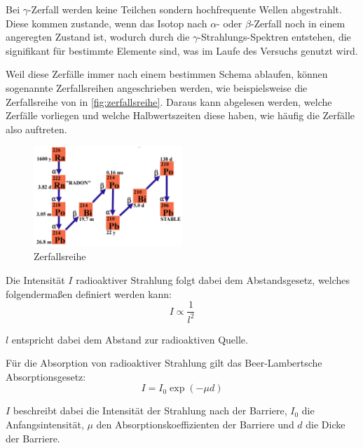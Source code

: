 \documentclass[12pt,english,ngerman]{scrartcl}
\begin{document}
Bei \(\gamma\)-Zerfall werden keine Teilchen sondern hochfrequente Wellen
abgestrahlt. Diese kommen zustande, wenn das Isotop nach \(\alpha\)- oder
\(\beta\)-Zerfall noch in einem angeregten Zustand ist, wodurch durch die
\(\gamma\)-Strahlungs-Spektren entstehen, die signifikant für bestimmte
Elemente sind, was im Laufe des Versuchs genutzt wird.

Weil diese Zerfälle immer nach einem bestimmen Schema ablaufen, können
sogenannte Zerfallsreihen angeschrieben werden, wie beispielsweise die
Zerfallsreihe von  in \autoref{fig:zerfallsreihe}. Daraus
kann abgelesen werden, welche Zerfälle vorliegen und welche Halbwertszeiten
diese haben, wie häufig die Zerfälle also auftreten.

\begin{figure}[H]
	\begin{center}
		\includegraphics[width = 0.5\textwidth]{./figures/zerfallsreihe.png}
	\end{center}
	\caption{Zerfallsreihe ~\cite{zerfallsreihera226}}\label{fig:zerfallsreihe}
\end{figure}

Die Intensität \(I\) radioaktiver Strahlung folgt dabei dem Abstandsgesetz,
welches folgendermaßen definiert werden kann:
\begin{equation}
	I \propto \frac{1}{l^2}
	\label{eq:abstandsgesetz}
\end{equation}

\(l\) entspricht dabei dem Abstand zur radioaktiven Quelle.

Für die Absorption von radioaktiver Strahlung gilt das Beer-Lambertsche
Absorptionsgesetz:
\begin{equation}
	I = I_0 \exp(-\mu d)
	\label{eq:beerschesgesetzt}
\end{equation}

\(I\) beschreibt dabei die Intensität der Strahlung nach der Barriere, \(I_0\)
die Anfangsintensität, \(\mu\) den Absorptionskoeffizienten der Barriere und
\(d\) die Dicke der Barriere.
\end{document}
